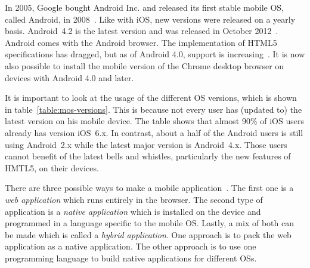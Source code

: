 \documentclass[a4paper]{artikel3}
\begin{document}
In 2005, Google bought Android Inc. and released its first stable mobile OS, called Android, in 2008~\cite{Satyesh2012}.
Like with iOS, new versions were released on a yearly basis.
Android~4.2 is the latest version and was released in October 2012~\cite{Sawers2012}.
Android comes with the Android browser.
The implementation of HTML5 specifications has dragged, but as of Android 4.0, support is increasing~\cite{Hales2012}.
It is now also possible to install the mobile version of the Chrome desktop browser on devices with Android 4.0 and later.

It is important to look at the usage of the different OS versions, which is shown in table~\ref{table:mos-versions}.
This is because not every user has (updated to) the latest version on his mobile device.
The table shows that almost 90\% of iOS users already has version iOS~6.x.
In contrast, about a half of the Android users is still using Android~2.x while the latest major version is Android~4.x. 
Those users cannot benefit of the latest bells and whistles, particularly the new features of HMTL5, on their devices.

\begin{table}[t]
\centering
{}
\quad
{}
\caption{Usage of iOS versions on May 8, 2013 and Android versions on May 1, 2013 \protect\cite{Smith2013,Android2013}.}
\label{table:mos-versions}
\end{table}

There are three possible ways to make a mobile application~\cite{Accenture2012,Hales2012}.
The first one is a \emph{web application} which runs entirely in the browser.
The second type of application is a \emph{native application} which is installed on the device and programmed in a language specific to the mobile OS.
Lastly, a mix of both can be made which is called a \emph{hybrid application}.
One approach is to pack the web application as a native application.
The other approach is to use one programming language to build native applications for different OSs.
\end{document}
